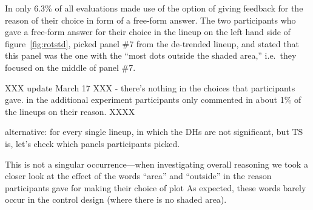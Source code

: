 \documentclass{article}\usepackage[]{graphicx}\usepackage[]{color}
\newcommand{\hh}[1]{{\color{magenta} #1}}
\newcommand{\alnote}[1]{\todo[inline,color=green!40]{#1}}
\newcommand{\hhnote}[1]{\todo[inline,color=magenta!40]{#1}}
\begin{document}
\hh{In only 6.3\% of all evaluations made use of the option of giving feedback for the reason of their choice in form of a free-form answer. }
%
\hh{The two participants who gave a free-form answer for their choice in the lineup on the left hand side of figure~\ref{fig:rotstd}, picked panel \#7 from the de-trended lineup, and stated that this panel was the one with the ``most dots outside the shaded area,'' i.e.~they focused on the middle of panel \#7}. 

\hh{XXX update March 17 XXX - there's nothing in the choices that participants gave. in the additional experiment participants only commented in about 1\% of the lineups on their reason. XXXX}

\hh{alternative: for every single lineup, in which the DHs are not significant, but TS is, let's check which panels participants picked. }

This is not a singular occurrence---when investigating  overall reasoning we took a closer look at the effect of the  words ``area'' and ``outside'' in the reason participants gave for making their choice of plot %
As expected, these words barely occur in the control design (where there is no shaded area).


\end{document}
